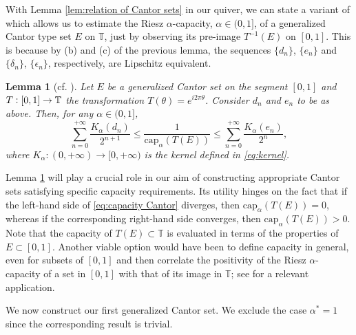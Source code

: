 \documentclass[12pt]{amsart}
\newtheorem{lemma}[theorem]{Lemma}
\theoremstyle{definition}\newtheorem{remark}[theorem]{Remark}
\theoremstyle{definition}\newtheorem{example}[theorem]{Example}
\theoremstyle{definition}\newtheorem{definition}{Definition}
\numberwithin{equation}{section}
\newcommand\TT{{\mathbb T}}
\begin{document}
With Lemma \ref{lem:relation of Cantor sets} in our quiver, we can state a variant of \cite[Theorem 2.3.5]{Primer} which allows us to estimate the Riesz $\alpha$-capacity, $\alpha\in(0,1]$, of a generalized Cantor type set $E$ on $\TT$, just by observing its pre-image $T^{-1}(E)$ on $[0,1]$. This is because by (b) and (c) of the previous lemma, the sequences $\{d_n\}$, $\{e_n\}$ and $\{\delta_n\}$, $\{\epsilon_n\}$, respectively, are Lipschitz equivalent.

\begin{lemma}[cf. {\cite[Theorem 2.3.5]{Primer}}]\label{lem:capacity of Cantor}
    Let $E$ be a generalized Cantor set on the segment $[0,1]$ and $T\vcentcolon[0,1]\to\TT$ the transformation $T(\theta)=e^{i2\pi\theta}$. Consider $d_n$ and $e_n$ to be as above. Then, for any $\alpha\in(0,1]$,
    \begin{equation}\label{eq:capacity Cantor}
        \sum_{n=0}^{+\infty}\frac{K_\alpha(d_n)}{2^{n+1}} \le \frac{1}{\mathrm{cap}_\alpha(T(E))} \le \sum_{n=0}^{+\infty}\frac{K_\alpha(e_n)}{2^n},
    \end{equation}
    where $K_\alpha:(0,+\infty)\to[0,+\infty)$ is the kernel defined in \eqref{eq:kernel}.
\end{lemma}
Lemma \ref{lem:capacity of Cantor} will play a crucial role in our aim of constructing appropriate Cantor sets satisfying specific capacity requirements. Its utility hinges on the fact that if the left-hand side of \eqref{eq:capacity Cantor} diverges, then $\mathrm{cap}_\alpha(T(E))=0$, whereas if the corresponding right-hand side converges, then $\mathrm{cap}_\alpha(T(E))>0$. Note that the capacity of $T(E)\subset\TT$ is evaluated in terms of the properties of $E\subset[0,1]$. Another viable option would have been to define capacity in general, even for subsets of $[0,1]$ and then correlate the positivity of the Riesz $\alpha$-capacity of a set in $[0,1]$ with that of its image in $\TT$; see \cite[Proposition 2]{Vavitsas-Zarvalis} for a relevant application.

We now construct our first generalized Cantor set. We exclude the case $\alpha^*=1$ since the corresponding result is trivial.
\end{document}
